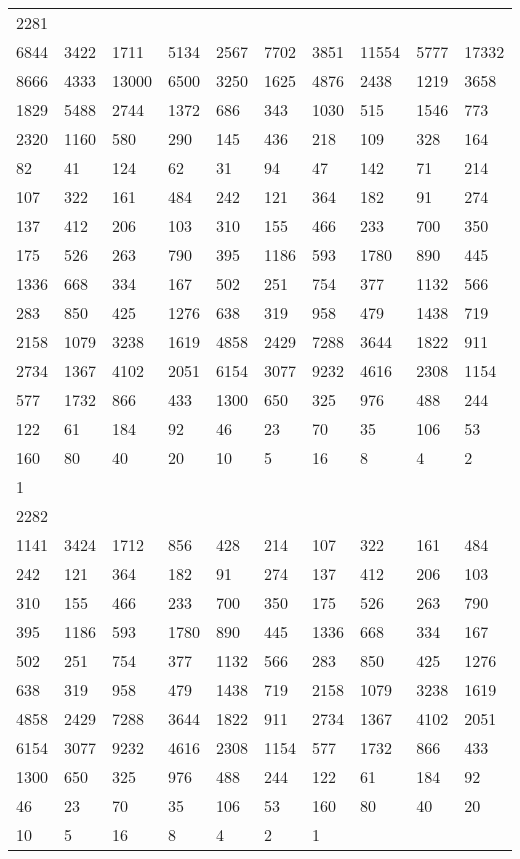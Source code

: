 \begin{longtable}{*{10}{l}}
2281&&&&&&&&&\\
6844& 3422& 1711& 5134& 2567& 7702& 3851& 11554& 5777& 17332\\
8666& 4333& 13000& 6500& 3250& 1625& 4876& 2438& 1219& 3658\\
1829& 5488& 2744& 1372& 686& 343& 1030& 515& 1546& 773\\
2320& 1160& 580& 290& 145& 436& 218& 109& 328& 164\\
82& 41& 124& 62& 31& 94& 47& 142& 71& 214\\
107& 322& 161& 484& 242& 121& 364& 182& 91& 274\\
137& 412& 206& 103& 310& 155& 466& 233& 700& 350\\
175& 526& 263& 790& 395& 1186& 593& 1780& 890& 445\\
1336& 668& 334& 167& 502& 251& 754& 377& 1132& 566\\
283& 850& 425& 1276& 638& 319& 958& 479& 1438& 719\\
2158& 1079& 3238& 1619& 4858& 2429& 7288& 3644& 1822& 911\\
2734& 1367& 4102& 2051& 6154& 3077& 9232& 4616& 2308& 1154\\
577& 1732& 866& 433& 1300& 650& 325& 976& 488& 244\\
122& 61& 184& 92& 46& 23& 70& 35& 106& 53\\
160& 80& 40& 20& 10& 5& 16& 8& 4& 2\\
1& \\

2282&&&&&&&&&\\
1141& 3424& 1712& 856& 428& 214& 107& 322& 161& 484\\
242& 121& 364& 182& 91& 274& 137& 412& 206& 103\\
310& 155& 466& 233& 700& 350& 175& 526& 263& 790\\
395& 1186& 593& 1780& 890& 445& 1336& 668& 334& 167\\
502& 251& 754& 377& 1132& 566& 283& 850& 425& 1276\\
638& 319& 958& 479& 1438& 719& 2158& 1079& 3238& 1619\\
4858& 2429& 7288& 3644& 1822& 911& 2734& 1367& 4102& 2051\\
6154& 3077& 9232& 4616& 2308& 1154& 577& 1732& 866& 433\\
1300& 650& 325& 976& 488& 244& 122& 61& 184& 92\\
46& 23& 70& 35& 106& 53& 160& 80& 40& 20\\
10& 5& 16& 8& 4& 2& 1& \\


\end{longtable}
